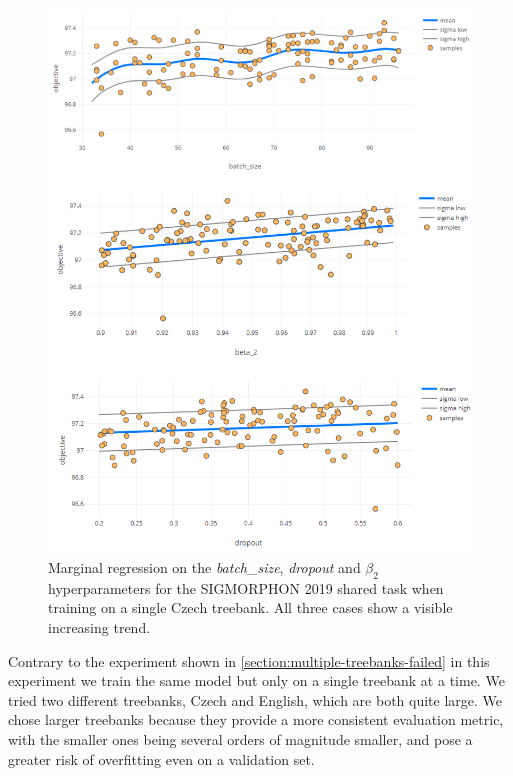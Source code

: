 \begin{figure}
	\begin{center}
		\includegraphics[width=1.0\textwidth]{images/czech-hyperparam-trends.png}
		\caption{Marginal regression on the \emph{batch\_size}, \emph{dropout} and $\beta_2$ hyperparameters for the SIGMORPHON 2019 shared task when training on a single Czech treebank. All three cases show a visible increasing trend.}
		\label{figure:czech-batch-size}
	\end{center}
\end{figure}


Contrary to the experiment shown in \autoref{section:multiple-treebanks-failed} in this experiment we train the same model but only on a single treebank at a time. We tried two different treebanks, Czech and English, which are both quite large. We chose larger treebanks because they provide a more consistent evaluation metric, with the smaller ones being several orders of magnitude smaller, and pose a greater risk of overfitting even on a validation set.

